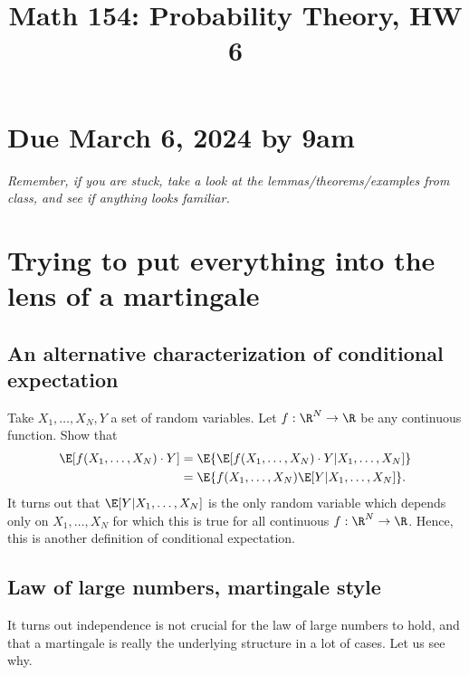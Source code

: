 \documentclass[12pt,reqno]{amsart}
\title{\Large Math 154: Probability Theory, HW 6\vspace{-0.1cm}}
\theoremstyle{definition}
\theoremstyle{remark}
\numberwithin{equation}{section}
\newenvironment{nouppercase}{%
  \let\uppercase\relax%
  \renewcommand{\uppercasenonmath}[1]{}}{}
\begin{document}
\begin{nouppercase}
\maketitle
\end{nouppercase}
\section*{Due March 6, 2024 by 9am}
\emph{Remember, if you are stuck, take a look at the lemmas/theorems/examples from class, and see if anything looks familiar.}
\section{Trying to put everything into the lens of a martingale}
\subsection{An alternative characterization of conditional expectation}
Take $X_{1},\ldots,X_{N},Y$ a set of random variables. Let $f:\R^{N}\to\R$ be any continuous function. Show that 
%
\begin{align*}
\E[f(X_{1},\ldots,X_{N})\cdot Y]&=\E\{\E[f(X_{1},\ldots,X_{N})\cdot Y|X_{1},\ldots,X_{N}]\}\\
&=\E\{f(X_{1},\ldots,X_{N})\E[Y|X_{1},\ldots,X_{N}]\}.
\end{align*}
%
It turns out that $\E[Y|X_{1},\ldots,X_{N}]$ is the only random variable which depends only on $X_{1},\ldots,X_{N}$ for which this is true for all continuous $f:\R^{N}\to\R$. Hence, this is another definition of conditional expectation.
\subsection{Law of large numbers, martingale style}
It turns out independence is not crucial for the law of large numbers to hold, and that a martingale is really the underlying structure in a lot of cases. Let us see why.
\end{document}

